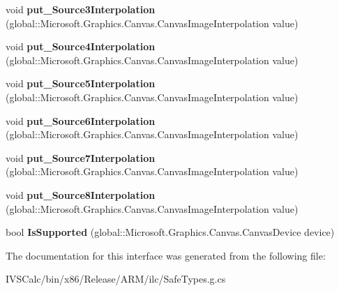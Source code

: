 \begin{DoxyCompactItemize}
\item 
\mbox{\label{interface_microsoft_1_1_graphics_1_1_canvas_1_1_effects_1_1_i_pixel_shader_effect_a680f1e84ebf42e030e0f1a5a5842944d}} 
void {\bfseries put\+\_\+\+Source3\+Interpolation} (global\+::\+Microsoft.\+Graphics.\+Canvas.\+Canvas\+Image\+Interpolation value)
\item 
\mbox{\label{interface_microsoft_1_1_graphics_1_1_canvas_1_1_effects_1_1_i_pixel_shader_effect_ad63dd0ae5f2600be010a92793511143d}} 
void {\bfseries put\+\_\+\+Source4\+Interpolation} (global\+::\+Microsoft.\+Graphics.\+Canvas.\+Canvas\+Image\+Interpolation value)
\item 
\mbox{\label{interface_microsoft_1_1_graphics_1_1_canvas_1_1_effects_1_1_i_pixel_shader_effect_aaf75f383e15e91bc0563349e2d4bde82}} 
void {\bfseries put\+\_\+\+Source5\+Interpolation} (global\+::\+Microsoft.\+Graphics.\+Canvas.\+Canvas\+Image\+Interpolation value)
\item 
\mbox{\label{interface_microsoft_1_1_graphics_1_1_canvas_1_1_effects_1_1_i_pixel_shader_effect_ad9f66401b19f61ce51eaf5f43fdae18e}} 
void {\bfseries put\+\_\+\+Source6\+Interpolation} (global\+::\+Microsoft.\+Graphics.\+Canvas.\+Canvas\+Image\+Interpolation value)
\item 
\mbox{\label{interface_microsoft_1_1_graphics_1_1_canvas_1_1_effects_1_1_i_pixel_shader_effect_a3141b1fa6f7290cd884ff32be5b22264}} 
void {\bfseries put\+\_\+\+Source7\+Interpolation} (global\+::\+Microsoft.\+Graphics.\+Canvas.\+Canvas\+Image\+Interpolation value)
\item 
\mbox{\label{interface_microsoft_1_1_graphics_1_1_canvas_1_1_effects_1_1_i_pixel_shader_effect_af68ecdcfaddf02fc7641f0ccfbf88dca}} 
void {\bfseries put\+\_\+\+Source8\+Interpolation} (global\+::\+Microsoft.\+Graphics.\+Canvas.\+Canvas\+Image\+Interpolation value)
\item 
\mbox{\label{interface_microsoft_1_1_graphics_1_1_canvas_1_1_effects_1_1_i_pixel_shader_effect_a10416df6a36fa55dfc26e3cf2cdc9b5f}} 
bool {\bfseries Is\+Supported} (global\+::\+Microsoft.\+Graphics.\+Canvas.\+Canvas\+Device device)
\end{DoxyCompactItemize}


The documentation for this interface was generated from the following file\+:\begin{DoxyCompactItemize}
\item 
I\+V\+S\+Calc/bin/x86/\+Release/\+A\+R\+M/ilc/Safe\+Types.\+g.\+cs\end{DoxyCompactItemize}
